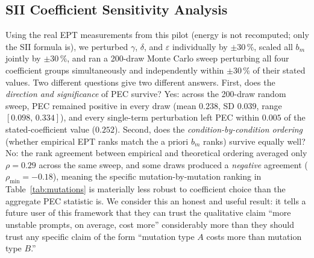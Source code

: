 \documentclass[conference]{IEEEtran}
\begin{document}
\subsection{SII Coefficient Sensitivity Analysis}
\label{sec:pilot-sensitivity}
Using the real EPT measurements from this pilot (energy is not
recomputed; only the SII formula is), we perturbed $\gamma$, $\delta$,
and $\varepsilon$ individually by $\pm 30\,\%$, scaled all $b_m$
jointly by $\pm 30\,\%$, and ran a 200-draw Monte Carlo sweep
perturbing all four coefficient groups simultaneously and
independently within $\pm 30\,\%$ of their stated values. Two
different questions give two different answers. First, does the
\emph{direction and significance} of PEC survive? Yes: across the
200-draw random sweep, PEC remained positive in every draw (mean
$0.238$, SD $0.039$, range $[0.098,\,0.334]$), and every single-term
perturbation left PEC within $0.005$ of the stated-coefficient value
($0.252$). Second, does the \emph{condition-by-condition ordering}
(whether empirical EPT ranks match the a priori $b_m$ ranks) survive
equally well? No: the rank agreement between empirical and theoretical
ordering averaged only $\rho=0.29$ across the same sweep, and some
draws produced a \emph{negative} agreement ($\rho_\text{min}=-0.18$),
meaning the specific mutation-by-mutation ranking in
Table~\ref{tab:mutations} is materially less robust to coefficient
choice than the aggregate PEC statistic is. We consider this an
honest and useful result: it tells a future user of this framework
that they can trust the qualitative claim ``more unstable prompts,
on average, cost more'' considerably more than they should trust any
specific claim of the form ``mutation type $A$ costs more than
mutation type $B$.''
\end{document}
